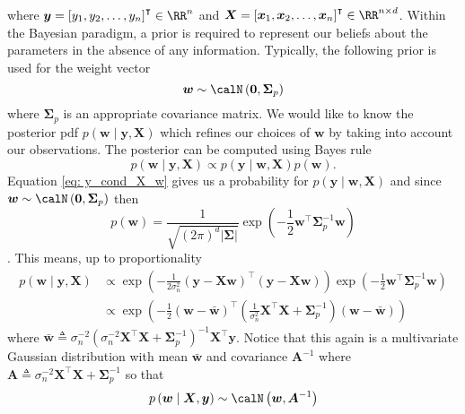 where $\bm{y} = \left[ y_1 , y_2 , \ldots , y_n \right]^{\intercal} \in \RR^n$ and $\bm{X} = \left[ \bm{x}_1 , \bm{x}_2 , \ldots , \bm{x}_n \right]^{\intercal} \in \RR^{n \times d}$. Within the Bayesian paradigm, a prior is required to represent our beliefs about the parameters in the absence of any information. Typically, the following prior is used for the weight vector
\[
    \bm{w} \sim \calN \left( \bm{0}, \bm{\Sigma}_p \right)
\]
where $\bm{\Sigma}_p$ is an appropriate covariance matrix. We would like to know the posterior pdf $p \left( \bm{w} \mid \bm{y} , \bm{X} \right)$ which refines our choices of $\bm{w}$ by taking into account our observations. The posterior can be computed using Bayes rule
\[
    p \left( \bm{w} \mid \bm{y} , \bm{X} \right) \propto p \left( \bm{y} \mid \bm{w} , \bm{X} \right) p \left( \bm{w} \right).
\]
Equation \ref{eq: y_cond_X_w} gives us a probability for $p \left( \bm{y} \mid \bm{w} , \bm{X} \right)$ and since $\bm{w} \sim \calN \left( \bm{0}, \bm{\Sigma}_p \right)$ then
\begin{equation*}
    p \left( \bm{w} \right) = \frac{1}{\sqrt{\left( 2 \pi \right)^{d} \left| \bm{\Sigma} \right|}} \exp \left( -\frac{1}{2} \bm{w}^{\intercal} \bm{\Sigma}_p^{-1} \bm{w} \right)
\end{equation*}
\cite{KroeseDirkP2014SMaC}. This means, up to proportionality
\begin{align*}
    p \left( \bm{w} \mid \bm{y} , \bm{X} \right)
     & \propto \exp \left( - \frac{1}{2 \sigma_n^2} \left( \bm{y} - \bm{X} \bm{w} \right)^{\intercal} \left( \bm{y} - \bm{X} \bm{w} \right) \right) \exp \left( -\frac{1}{2} \bm{w}^{\intercal} \bm{\Sigma}_p^{-1} \bm{w} \right) \\
     & \propto \exp \left( - \frac{1}{2} \left( \bm{w} - \bar{\bm{w}} \right)^{\intercal} \left( \frac{1}{\sigma^2_n} \bm{X}^{\intercal} \bm{X} + \bm{\Sigma}_p^{-1} \right) \left( \bm{w} - \bar{\bm{w}} \right) \right)
\end{align*}
where $\bar{\bm{w}} \triangleq \sigma_{n}^{-2} \left( \sigma_{n}^{-2} \bm{X}^{\intercal} \bm{X} + \bm{\Sigma}_p^{-1} \right)^{-1} \bm{X}^{\intercal} \bm{y}$. Notice that this again is a multivariate Gaussian distribution with mean $\bar{\bm{w}}$ and covariance $\bm{A}^{-1}$ where $\bm{A} \triangleq \sigma_{n}^{-2} \bm{X}^{\intercal} \bm{X} + \bm{\Sigma}_p^{-1}$ so that
\begin{equation*}
    p \left( \bm{w} \mid \bm{X} , \bm{y} \right) \sim \calN \left( \bm{w} , \bm{A}^{-1} \right)
\end{equation*}

